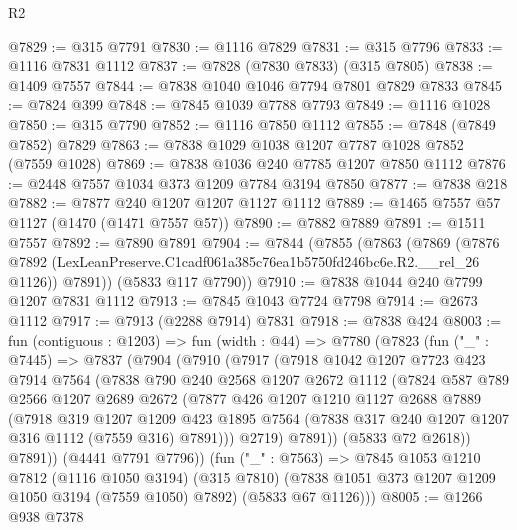 \begin{lexlean}{R2}
\begin{coremodule}
@7829 := @315 @7791
@7830 := @1116 @7829
@7831 := @315 @7796
@7833 := @1116 @7831 @1112
@7837 := @7828 (@7830 @7833) (@315 @7805)
@7838 := @1409 @7557
@7844 := @7838 @1040 @1046 @7794 @7801 @7829 @7833
@7845 := @7824 @399
@7848 := @7845 @1039 @7788 @7793
@7849 := @1116 @1028
@7850 := @315 @7790
@7852 := @1116 @7850 @1112
@7855 := @7848 (@7849 @7852) @7829
@7863 := @7838 @1029 @1038 @1207 @7787 @1028 @7852 (@7559 @1028)
@7869 := @7838 @1036 @240 @7785 @1207 @7850 @1112
@7876 := @2448 @7557 @1034 @373 @1209 @7784 @3194 @7850
@7877 := @7838 @218
@7882 := @7877 @240 @1207 @1207 @1127 @1112
@7889 := @1465 @7557 @57 @1127 (@1470 (@1471 @7557 @57))
@7890 := @7882 @7889
@7891 := @1511 @7557
@7892 := @7890 @7891
@7904 := @7844
    (@7855
      (@7863
        (@7869
          (@7876 @7892 (LexLeanPreserve.C1cadf061a385c76ea1b5750fd246bc6e.R2.__rel_26 @1126))
          @7891))
      (@5833 @117 @7790))
@7910 := @7838 @1044 @240 @7799 @1207 @7831 @1112
@7913 := @7845 @1043 @7724 @7798
@7914 := @2673 @1112
@7917 := @7913 (@2288 @7914) @7831
@7918 := @7838 @424
@8003 := fun (contiguous : @1203) =>
  fun (width : @44) =>
  @7780
    (@7823
      (fun ("_" : @7445) =>
      @7837
        (@7904
          (@7910
            (@7917
              (@7918
                @1042
                @1207
                @7723
                @423
                @7914
                @7564
                (@7838
                  @790
                  @240
                  @2568
                  @1207
                  @2672
                  @1112
                  (@7824
                    @587
                    @789
                    @2566
                    @1207
                    @2689
                    @2672
                    (@7877
                      @426
                      @1207
                      @1210
                      @1127
                      @2688
                      @7889
                      (@7918
                        @319
                        @1207
                        @1209
                        @423
                        @1895
                        @7564
                        (@7838 @317 @240 @1207 @1207 @316 @1112 (@7559 @316) @7891)))
                    @2719)
                  @7891))
              (@5833 @72 @2618))
            @7891))
        (@4441 @7791 @7796))
      (fun ("_" : @7563) =>
      @7845
        @1053
        @1210
        @7812
        (@1116 @1050 @3194)
        (@315 @7810)
        (@7838 @1051 @373 @1207 @1209 @1050 @3194 (@7559 @1050) @7892)
        (@5833 @67 @1126)))
@8005 := @1266 @938 @7378

\end{coremodule}
\end{lexlean}
